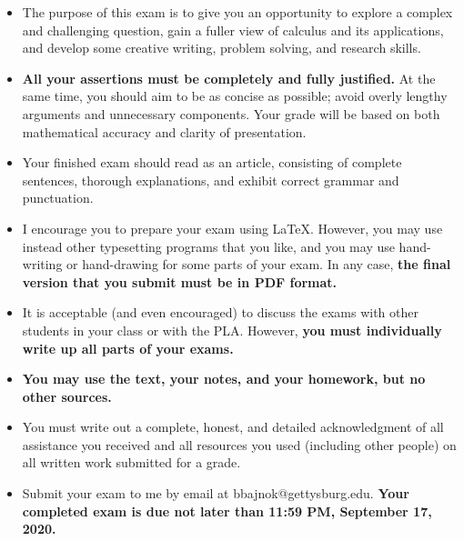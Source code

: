 \documentclass[12pt]{article}
\begin{document}
\begin{itemize}
  
\item The purpose of this exam is to give you an opportunity to explore a complex and challenging question, gain a fuller view of calculus and its applications, and develop some creative writing, problem solving, and research skills.

\item  {\bf All your assertions must be completely and fully justified.} At the same time, you should aim to be as concise as possible; avoid overly lengthy arguments and unnecessary components.  Your grade will be based on both mathematical accuracy and clarity of presentation.

\item 
Your finished exam should read as an article, consisting of complete sentences, thorough explanations, and exhibit correct grammar and punctuation.

\item I encourage you to prepare your exam using LaTeX.  However, you may use instead other typesetting programs that you like, and you may use hand-writing or hand-drawing for some parts of your exam.  In any case, {\bf the final version that you submit must be in PDF format.}  

\item It is acceptable (and even encouraged) to discuss the exams with other students in your class or with the PLA.  However,  {\bf  you must individually write up all parts of your exams.}

\item {\bf You may use the text, your notes, and your homework, but no other sources.}
 
\item You must write out a complete, honest, and detailed acknowledgment of all assistance you received and all resources you used (including other people) on all written work submitted for a grade.

\item Submit your exam to me by email at bbajnok@gettysburg.edu.  {\bf Your completed exam is due not later than 11:59 PM, September 17, 2020.}







\end{itemize}

\end{document}
